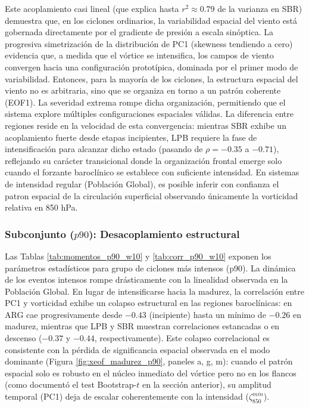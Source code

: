 

Este acoplamiento casi lineal (que explica hasta $r^2 \approx 0.79$ de la varianza en SBR) demuestra que, en los ciclones ordinarios, la variabilidad espacial del viento está gobernada directamente por el gradiente de presión a escala sinóptica. 
La progresiva simetrización de la distribución de PC1 (skewness tendiendo a cero) evidencia que, a medida que el vórtice se intensifica, los campos de viento convergen hacia una configuración prototípica, dominada por el primer modo de variabilidad. 
Entonces, para la mayoría de los ciclones, la estructura espacial del viento no es arbitraria, sino que se organiza en torno a un patrón coherente (EOF1). 
La severidad extrema rompe dicha organización, permitiendo que el sistema explore múltiples configuraciones espaciales válidas.
La diferencia entre regiones reside en la velocidad de esta convergencia: mientras SBR exhibe un acoplamiento fuerte desde etapas incipientes, LPB requiere la fase de intensificación para alcanzar dicho estado (pasando de $\rho = -0.35$ a $-0.71$), reflejando su carácter transicional donde la organización frontal emerge solo cuando el forzante baroclínico se establece con suficiente intensidad.
En sistemas de intensidad regular (Población Global), es posible inferir con confianza el patron espacial de la circulación superficial observando únicamente la vorticidad relativa en 850 hPa.

\subsubsection{Subconjunto ($p90$): Desacoplamiento estructural}

Las Tablas \ref{tab:momentos_p90_w10} y \ref{tab:corr_p90_w10} exponen los parámetros estadísticos para grupo de ciclones más intensos (p90). 
La dinámica de los eventos intensos rompe drásticamente con la linealidad observada en la Población Global. 
En lugar de intensificarse hacia la madurez, la correlación entre PC1 y vorticidad exhibe un colapso estructural en las regiones baroclínicas: en ARG cae progresivamente desde $-0.43$ (incipiente) hasta un mínimo de $-0.26$ en madurez, mientras que LPB y SBR muestran correlaciones estancadas o en descenso ($-0.37$ y $-0.44$, respectivamente). 
Este colapso correlacional es consistente con la pérdida de significancia espacial observada en el modo dominante (Figura \ref{fig:xeof_madurez_p90}, paneles a, g, m): cuando el patrón espacial solo es robusto en el núcleo inmediato del vórtice pero no en los flancos (como documentó el test Bootstrap-$t$ en la sección anterior), su amplitud temporal (PC1) deja de escalar coherentemente con la intensidad ($\zeta_{850}^{min}$).

